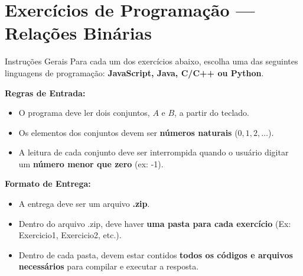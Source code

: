 \documentclass[12pt]{article}
\begin{document}
\vspace*{0.2cm}
\section*{Exercícios de Programação — Relações Binárias}

\begin{block}{Instruções Gerais}
Para cada um dos exercícios abaixo, escolha uma das seguintes linguagens de programação: \textbf{JavaScript, Java, C/C++ ou Python}. 

\textbf{Regras de Entrada:}
\begin{itemize}
    \item O programa deve ler dois conjuntos, $A$ e $B$, a partir do teclado.
    \item Os elementos dos conjuntos devem ser \textbf{números naturais} ($0, 1, 2, \dots$).
    \item A leitura de cada conjunto deve ser interrompida quando o usuário digitar um \textbf{número menor que zero} (ex: -1).
\end{itemize}

\textbf{Formato de Entrega:}
\begin{itemize}
    \item A entrega deve ser um arquivo \textbf{.zip}.
    \item Dentro do arquivo .zip, deve haver \textbf{uma pasta para cada exercício} (Ex: Exercicio1, Exercicio2, etc.).
    \item Dentro de cada pasta, devem estar contidos \textbf{todos os códigos e arquivos necessários} para compilar e executar a resposta.
\end{itemize}
\end{block}
\end{document}
